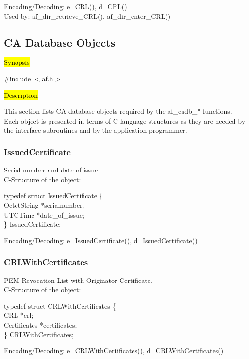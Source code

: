 Encoding/Decoding: e\_CRL(), d\_CRL() \\
Used by: af\_dir\_retrieve\_CRL(), af\_dir\_enter\_CRL()


\subsection{CA Database Objects}
\label{cadb}

\hl{Synopsis}

\#include $<$af.h$>$

\hl{Description}
     
This section lists CA database objects required by the af\_cadb\_* functions. 
Each object is presented in terms of C-language structures as they are needed by the 
interface subroutines and by the application programmer. 
\subsubsection{IssuedCertificate}
Serial number and date of issue. \\
\underline{C-Structure of the object:}

{\small
\btab
\1      typedef struct IssuedCertificate \{ \\
\2              OctetString  \2          *serialnumber; \\
\2              UTCTime \2  *date\_of\_issue; \\
\1       \} IssuedCertificate; \\
\etab
}

Encoding/Decoding: e\_IssuedCertificate(), d\_IssuedCertificate()

\subsubsection{CRLWithCertificates}
PEM Revocation List with Originator Certificate. \\
\underline{C-Structure of the object:}

{\small
\btab
\1      typedef struct CRLWithCertificates \{ \\
\2              CRL  \2          *crl; \\
\2              Certificates \2  *certificates; \\
\1       \} CRLWithCertificates; \\
\etab
}

Encoding/Decoding: e\_CRLWithCertificates(), d\_CRLWithCertificates()



